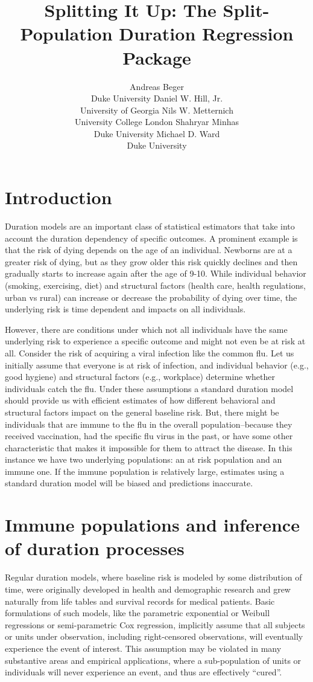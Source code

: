 \documentclass[article]{jss}
\author{
Andreas Beger\\Duke University \And Daniel W. Hill, Jr.\\University of Georgia \And Nils W. Metternich\\University College London \AND Shahryar Minhas\\Duke University \And Michael D. Ward\\Duke University
}
\title{Splitting It Up: The \pkg{spduration} Split-Population Duration
Regression Package}
\begin{document}
\section{Introduction}

Duration models are an important class of statistical estimators that
take into account the duration dependency of specific outcomes. A
prominent example is that the risk of dying depends on the age of an
individual. Newborns are at a greater risk of dying, but as they grow
older this risk quickly declines and then gradually starts to increase
again after the age of 9-10. While individual behavior (smoking,
exercising, diet) and structural factors (health care, health
regulations, urban vs rural) can increase or decrease the probability of
dying over time, the underlying risk is time dependent and impacts on
all individuals.

However, there are conditions under which not all individuals have the
same underlying risk to experience a specific outcome and might not even
be at risk at all. Consider the risk of acquiring a viral infection like
the common flu. Let us initially assume that everyone is at risk of
infection, and individual behavior (e.g., good hygiene) and structural
factors (e.g., workplace) determine whether individuals catch the flu.
Under these assumptions a standard duration model should provide us with
efficient estimates of how different behavioral and structural factors
impact on the general baseline risk. But, there might be individuals
that are immune to the flu in the overall population--because they
received vaccination, had the specific flu virus in the past, or have
some other characteristic that makes it impossible for them to attract
the disease. In this instance we have two underlying populations: an at
risk population and an immune one. If the immune population is
relatively large, estimates using a standard duration model will be
biased and predictions inaccurate.

\section{Immune populations and inference of duration
processes}

Regular duration models, where baseline risk is modeled by some
distribution of time, were originally developed in health and
demographic research and grew naturally from life tables and survival
records for medical patients. Basic formulations of such models, like
the parametric exponential or Weibull regressions or semi-parametric Cox
regression, implicitly assume that all subjects or units under
observation, including right-censored observations, will eventually
experience the event of interest. This assumption may be violated in
many substantive areas and empirical applications, where a
sub-population of units or individuals will never experience an event,
and thus are effectively ``cured''.
\end{document}
